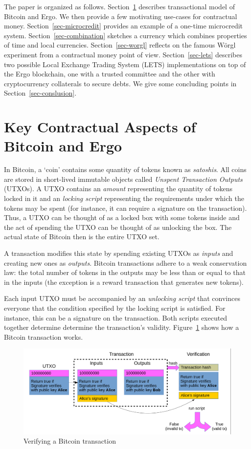 \documentclass[]{llncs}   %
\begin{document}
The paper is organized as follows. Section~\ref{sec-txmodel} describes transactional model of Bitcoin and Ergo. We then  provide a few motivating use-cases for contractual money. Section~\ref{sec-microcredit} provides an example of a one-time microcredit system. Section~\ref{sec-combination} sketches a currency which combines properties of time and local currencies. Section~\ref{sec-worgl} reflects on the famous W\"{o}rgl experiment from a contractual money point of view. Section~\ref{sec-lets} describes two possible Local Exchange Trading System (LETS) implementations on top of the Ergo blockchain, one with a trusted committee and the other with cryptocurrency collaterals to secure debts. We give some concluding points in Section~\ref{sec-conslusion}.


\section{Key Contractual Aspects of Bitcoin and Ergo}
\label{sec-txmodel}

In Bitcoin, a `coin' contains some quantity of tokens known as {\em satoshis}. All coins are stored in short-lived immutable objects called {\em Unspent Transaction Outputs} (UTXOs). 
A UTXO contains an {\em amount} representing the quantity of tokens locked in it and an {\em locking script} representing the requirements under which the tokens may be spent (for instance, it can require a signature on the transaction). Thus, a UTXO can be thought of as a locked box with some tokens inside and the act of spending the UTXO can be thought of as unlocking the box.
The actual state of Bitcoin then is the entire UTXO set. 

A transaction modifies this state by spending existing UTXOs as {\em inputs} and creating new ones as {\em outputs}. 
Bitcoin transactions adhere to a weak conservation law: the total number of tokens in the outputs may be less than or equal to that in the inputs (the exception is a reward transaction that generates new tokens).

Each input UTXO must be accompanied by an {\em unlocking script} that convinces everyone that the condition specified by the locking script is satisfied. For instance, this can be a signature on the transaction. Both scripts executed together determine determine the transaction's validity.
Figure~\ref{fig1} shows how a Bitcoin transaction works.
\begin{figure}
	\includegraphics[scale=0.24]{bitcoin}
	\caption{Verifying a Bitcoin transaction}
	\label{fig1}
\end{figure}
\end{document}
